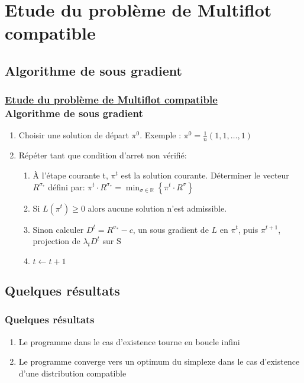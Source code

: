 \documentclass[t,10pt]{beamer}
\begin{document}
    \section{Etude du problème de Multiflot compatible}

    \subsection{Algorithme de sous gradient}
    \begin{frame}\frametitle{\underline{Etude du problème de Multiflot compatible} \\ \small Algorithme de sous gradient}
        \begin{enumerate}
            \item Choisir une solution de départ $\pi^{0}$. Exemple : \vspace{0.2cm} $\pi^{0} = \frac{1}{n} (1,1,\dots,1)$
            \item Répéter tant que condition d'arret non vérifié:
            \begin{enumerate}
                \item À l’étape courante t, $\pi^{t}$ est la solution courante. Déterminer le vecteur
                $R^{\sigma_{*}}$ défini par: \vspace{0.2cm} $\pi^{t} \cdot R^{\sigma_{*}}
                = \displaystyle \min_{\sigma \in \mathbb{R}} \left\{\pi^{t} \cdot R^{\sigma} \right\}$
                \item Si $L(\pi^{t}) \ge 0$ alors aucune solution n'est admissible.
                \item Sinon calculer $D^{t} = R^{\sigma_{*}} - c$, un sous gradient de $L$ en $\pi^{t}$, puis $\pi^{t+1}$,
                projection de $\lambda_{t}D^{t}$ sur S
                 \item $t \leftarrow t+1$
            \end{enumerate}
        \end{enumerate}
    \end{frame}

    \subsection{Quelques résultats}
    \begin{frame}\frametitle{\small Quelques résultats}
        \vspace{2cm}
        \begin{enumerate}
            \item Le programme dans le cas d'existence tourne en boucle infini
            \item Le programme converge vers un optimum du simplexe dans le cas d'existence d'une distribution compatible
        \end{enumerate}
    \end{frame}
\end{document}
